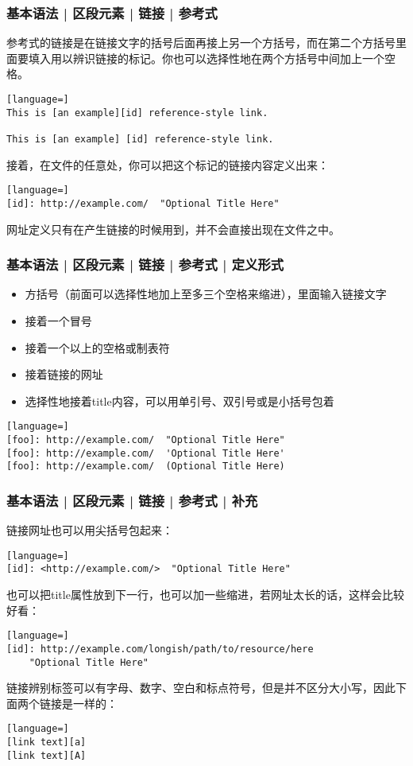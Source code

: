 \begin{frame}[fragile]
  \frametitle{基本语法 | 区段元素 | 链接 | \alert{参考式}}
  参考式的链接是在链接文字的括号后面再接上另一个方括号，而在第二个方括号里面要填入用以辨识链接的标记。你也可以选择性地在两个方括号中间加上一个空格。
\begin{lstlisting}[language=]
This is [an example][id] reference-style link.

This is [an example] [id] reference-style link.
\end{lstlisting}
接着，在文件的任意处，你可以把这个标记的链接内容定义出来：
\begin{lstlisting}[language=]
[id]: http://example.com/  "Optional Title Here"
\end{lstlisting}
\pause
网址定义只有在产生链接的时候用到，并不会直接出现在文件之中。
\end{frame}

\begin{frame}[fragile]
  \frametitle{基本语法 | 区段元素 | 链接 | 参考式 | \alert{定义形式}}
  \begin{itemize}
    \item 方括号（前面可以选择性地加上至多三个空格来缩进），里面输入链接文字
    \item 接着一个冒号
    \item 接着一个以上的空格或制表符
    \item 接着链接的网址
    \item 选择性地接着title内容，可以用单引号、双引号或是小括号包着
  \end{itemize}
\begin{lstlisting}[language=]
[foo]: http://example.com/  "Optional Title Here"
[foo]: http://example.com/  'Optional Title Here'
[foo]: http://example.com/  (Optional Title Here)
\end{lstlisting}
\end{frame}

\begin{frame}[fragile]
  \frametitle{基本语法 | 区段元素 | 链接 | 参考式 | 补充}
  链接网址也可以用尖括号包起来：
\begin{lstlisting}[language=]
[id]: <http://example.com/>  "Optional Title Here"
\end{lstlisting}
\pause
也可以把title属性放到下一行，也可以加一些缩进，若网址太长的话，这样会比较好看：
\begin{lstlisting}[language=]
[id]: http://example.com/longish/path/to/resource/here
    "Optional Title Here"
\end{lstlisting}
\pause
链接辨别标签可以有字母、数字、空白和标点符号，但是并不区分大小写，因此下面两个链接是一样的：
\begin{lstlisting}[language=]
[link text][a]
[link text][A]
\end{lstlisting}
\end{frame}

